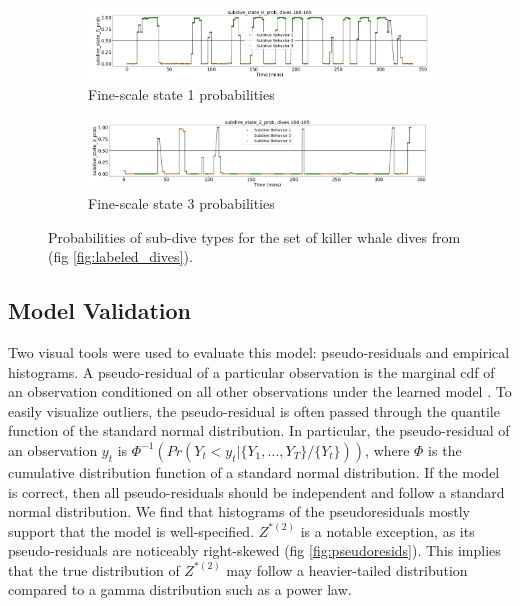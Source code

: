 \begin{figure}[ht]
	\centering
	\begin{subfigure}[t]{1.0\textwidth}
        \centering
        \includegraphics[width=5in]{../Plots/Fine_state_probs_1.png}
        \caption{Fine-scale state 1 probabilities}
    \end{subfigure}
    \newline
    \begin{subfigure}[t]{1.0\textwidth}
        \centering
        \includegraphics[width=5in]{../Plots/Fine_state_probs_3.png}
        \caption{Fine-scale state 3 probabilities}
    \end{subfigure}
	\caption{Probabilities of sub-dive types for the set of killer whale dives from (fig \ref{fig:labeled_dives}).}
	\label{fig:fine_probs}
\end{figure}

\subsection{Model Validation}
\label{subsec:model_validation}

Two visual tools were used to evaluate this model: pseudo-residuals and empirical histograms. A pseudo-residual of a particular observation is the marginal cdf of an observation conditioned on all other observations under the learned model \citep{Zucchini:2016}. To easily visualize outliers, the pseudo-residual is often passed through the quantile function of the standard normal distribution. In particular, the pseudo-residual of an observation $y_t$ is $\Phi^{-1} \left(Pr(Y_t < y_t|\{Y_1,\ldots,Y_T\}/\{Y_t\}) \right)$, where $\Phi$ is the cumulative distribution function of a standard normal distribution. If the model is correct, then all pseudo-residuals should be independent and follow a standard normal distribution. We find that histograms of the pseudoresiduals mostly support that the model is well-specified. $Z^{*(2)}$ is a notable exception, as its pseudo-residuals are noticeably right-skewed (fig \ref{fig:pseudoresids}). This implies that the true distribution of $Z^{*(2)}$ may follow a heavier-tailed distribution compared to a gamma distribution such as a power law. 


